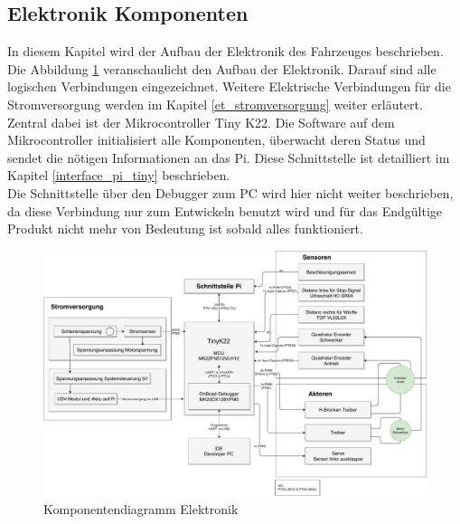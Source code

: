 \documentclass[../../main.tex]{subfiles}
\begin{document}
    \subsection{Elektronik Komponenten}
    In diesem Kapitel wird der Aufbau der Elektronik des Fahrzeuges beschrieben. Die Abbildung \ref{fig:et_komponenten} veranschaulicht den Aufbau der Elektronik. Darauf sind alle logischen Verbindungen eingezeichnet. Weitere Elektrische Verbindungen für die Stromversorgung werden im Kapitel \ref{et_stromversorgung} weiter erläutert.\\
    Zentral dabei ist der Mikrocontroller Tiny K22. Die Software auf dem Mikrocontroller initialisiert alle Komponenten, überwacht deren Status und sendet die nötigen Informationen an  das Pi. Diese Schnittstelle ist detailliert im Kapitel \ref{interface_pi_tiny} beschrieben.\\
    Die Schnittstelle über den Debugger zum PC wird hier nicht weiter beschrieben, da diese Verbindung nur zum Entwickeln benutzt wird und für das Endgültige Produkt nicht mehr von Bedeutung ist sobald alles funktioniert.

    \begin{figure}[H]
        \centering
        \includegraphics[width=1.0\textwidth]{../../drawings/KomponentenDiagramm/KomponentenDiagramm_ET.pdf}
        \caption {Komponentendiagramm Elektronik}
        \label{fig:et_komponenten}
    \end{figure}
\end{document}
